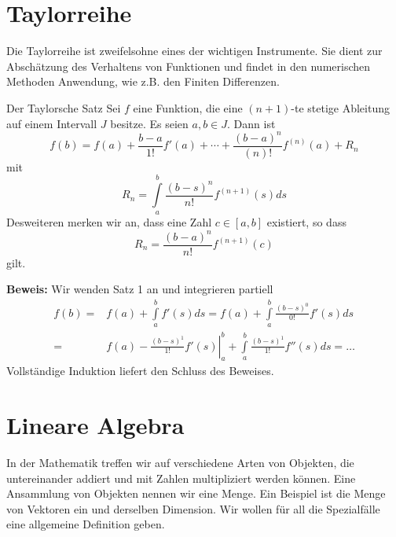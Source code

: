 \section{Taylorreihe}
Die Taylorreihe ist zweifelsohne eines der wichtigen Instrumente. Sie dient zur
Abschätzung des Verhaltens von Funktionen und findet in den numerischen
Methoden Anwendung, wie z.B. den Finiten Differenzen.
\begin{satz}{Der Taylorsche Satz\label{theo:Taylor}} Sei $f$ eine Funktion, die
  eine $(n+1)$-te stetige Ableitung auf einem Intervall $J$ besitze. Es seien
  $a,b\in J$. Dann ist 
\[
    f(b)=f(a)+\frac{b-a}{1!}f'(a)+\cdots +\frac{(b-a)^{n}}{(n)!}f^{(n)}(a)+R_n
\]
  mit
\[
    R_n=\int\limits_a^b\frac{(b-s)^{n}}{n!}f^{(n+1)}(s)ds
\]
Desweiteren merken wir an, dass eine Zahl $c\in[a,b]$ existiert, so dass
\[
    R_n=\frac{(b-a)^{n}}{n!}f^{(n+1)}(c)
\]
gilt.
\end{satz}
{\bf Beweis:} Wir wenden Satz 1 an und integrieren partiell
\begin{align}
  f(b)=&f(a)+\int\limits_a^bf'(s)ds=f(a)+\int\limits_a^b\frac{(b-s)^0}{0!}f'(s)ds\nonumber\\
  =&f(a)-\left.\frac{(b-s)^1}{1!}f'(s)\right|_a^b+\int\limits_a^b\frac{(b-s)^1}{1!}f''(s)ds=\dots
  \label{eq:TaylorProof1}
\end{align}
Vollständige Induktion liefert den Schluss des Beweises.
\section{Lineare Algebra}
In der Mathematik treffen wir auf verschiedene Arten von Objekten, die
untereinander addiert und mit Zahlen multipliziert werden können. Eine
Ansammlung von Objekten nennen wir eine Menge. Ein Beispiel ist die Menge von
Vektoren ein und derselben Dimension. Wir wollen für all die
Spezialfälle eine allgemeine Definition geben. 
